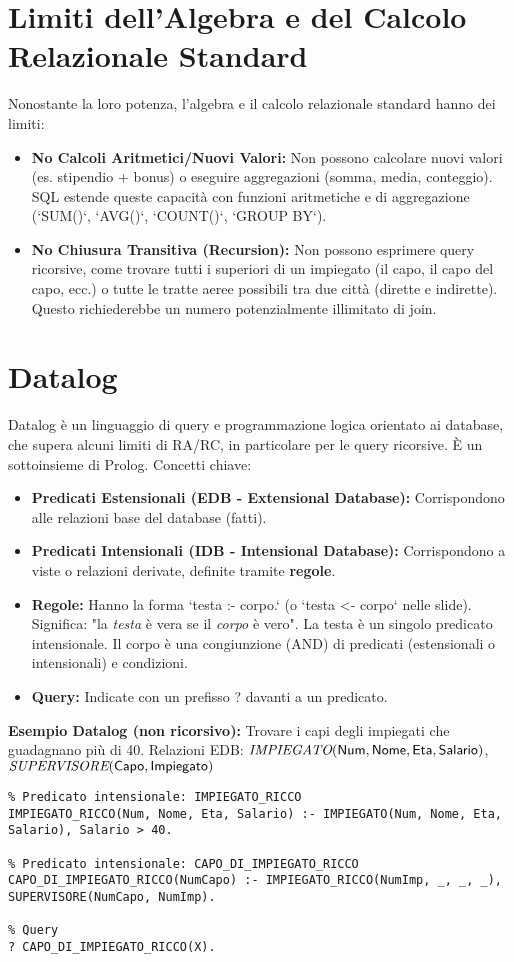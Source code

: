 	\section{Limiti dell'Algebra e del Calcolo Relazionale Standard}
	Nonostante la loro potenza, l'algebra e il calcolo relazionale standard hanno dei limiti:
	\begin{itemize}
		\item \textbf{No Calcoli Aritmetici/Nuovi Valori:} Non possono calcolare nuovi valori (es. stipendio + bonus) o eseguire aggregazioni (somma, media, conteggio). SQL estende queste capacità con funzioni aritmetiche e di aggregazione (`SUM()`, `AVG()`, `COUNT()`, `GROUP BY`).
		\item \textbf{No Chiusura Transitiva (Recursion):} Non possono esprimere query ricorsive, come trovare tutti i superiori di un impiegato (il capo, il capo del capo, ecc.) o tutte le tratte aeree possibili tra due città (dirette e indirette). Questo richiederebbe un numero potenzialmente illimitato di join.
	\end{itemize}
	
	\section{Datalog}
	Datalog è un linguaggio di query e programmazione logica orientato ai database, che supera alcuni limiti di RA/RC, in particolare per le query ricorsive. È un sottoinsieme di Prolog.
	Concetti chiave:
	\begin{itemize}
		\item \textbf{Predicati Estensionali (EDB - Extensional Database):} Corrispondono alle relazioni base del database (fatti).
		\item \textbf{Predicati Intensionali (IDB - Intensional Database):} Corrispondono a viste o relazioni derivate, definite tramite \textbf{regole}.
		\item \textbf{Regole:} Hanno la forma `testa :- corpo.` (o `testa <- corpo` nelle slide).
		Significa: "la \textit{testa} è vera se il \textit{corpo} è vero".
		La testa è un singolo predicato intensionale. Il corpo è una congiunzione (AND) di predicati (estensionali o intensionali) e condizioni.
		\item \textbf{Query:} Indicate con un prefisso ? davanti a un predicato.
	\end{itemize}
	
	\textbf{Esempio Datalog (non ricorsivo):} Trovare i capi degli impiegati che guadagnano più di 40.
	Relazioni EDB: $\textit{IMPIEGATO}(\textsf{Num}, \textsf{Nome}, \textsf{Eta}, \textsf{Salario})$, $\textit{SUPERVISORE}(\textsf{Capo}, \textsf{Impiegato})$
	\begin{verbatim}
% Predicato intensionale: IMPIEGATO_RICCO
IMPIEGATO_RICCO(Num, Nome, Eta, Salario) :- IMPIEGATO(Num, Nome, Eta, Salario), Salario > 40.

% Predicato intensionale: CAPO_DI_IMPIEGATO_RICCO
CAPO_DI_IMPIEGATO_RICCO(NumCapo) :- IMPIEGATO_RICCO(NumImp, _, _, _),
SUPERVISORE(NumCapo, NumImp).

% Query
? CAPO_DI_IMPIEGATO_RICCO(X).
	\end{verbatim}
	
